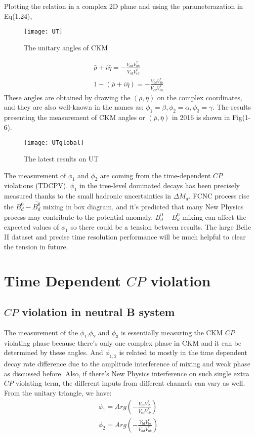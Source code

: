 Plotting the relation in a complex 2D plane and using the parameterazation in Eq(1.24),
\begin{figure}[htpb]
	\centering
	\texttt{[image: UT]}
	\caption{The unitary angles of CKM}
\end{figure}
\begin{eqnarray}
\bar{\rho}+i\bar{\eta}=- \frac{V_{ud}V^*_{ub}}{V_{cd}V^*_{cb}}\\
1-(\bar{\rho}+i\bar{\eta})=-\frac{V_{td}V^*_{tb}}{V_{cd}V^*_{cb}}
\end{eqnarray}
These angles are obtained by drawing the $(\bar{\rho},\bar{\eta})$ on the complex coordinates, and they are also well-known in the names as: $\phi_1=\beta,\phi_2=\alpha,\phi_3=\gamma$. The results presenting the measurement of CKM angles or $(\bar{\rho},\bar{\eta})$ in 2016 is shown in Fig(1-6).
\begin{figure}[htbp]
	\centering
	\texttt{[image: UTglobal]}
	\caption{The latest results on UT\cite{b2book}}
\end{figure}

The measurement of $\phi_1$ and $\phi_2$ are coming from the time-dependent $CP$ violations (TDCPV). $\phi_1$ in the tree-level dominated decays has been precisely measured thanks to the small hadronic uncertainties in $\Delta M_d$. FCNC process rise the $B^0_d-\bar{B^0_d}$ mixing in box diagram, and it's predicted that many New Physics process may contribute to the potential anomaly.
$B_d^0-\bar{B_d^0}$ mixing can affect the expected values of $\phi_1$ so there could be a tension between results. The large Belle II dataset and precise time resolution performance will be much helpful to clear the tension in future. 

\section{Time Dependent $CP$ violation}
\subsection{ $CP$ violation in neutral B system}
The measurement of the $\phi_1$,$\phi_2$ and $\phi_3$ is essentially measuring the CKM $CP$ violating phase because there's only one complex phase in CKM and it can be determined by these angles. And $\phi_{1,2}$ is related to mostly in the time dependent decay rate difference due to the amplitude interference of mixing and weak phase as discussed before. Also, if there's New Physics interference on such single extra $CP$ violating term, the different inputs from different channels can vary as well. From the unitary triangle, we have: 
\begin{eqnarray}
\phi_1=Arg(-\frac{V_{td}V^*_{tb}}{V_{cd}V^*_{cb}})\\
\phi_2=Arg(-\frac{V_{td}V^*_{tb}}{V_{ud}V^*_{ub}})
\end{eqnarray}

